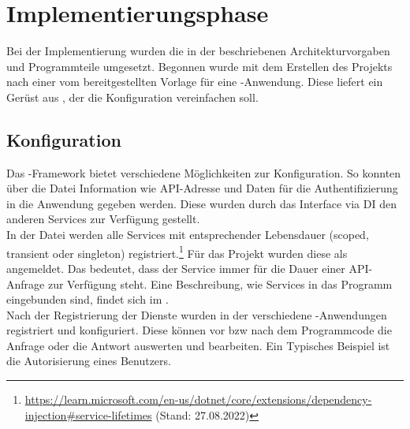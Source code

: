 \section{Implementierungsphase} 
\label{sec:Implementierungsphase}
Bei der Implementierung wurden die in der  beschriebenen Architekturvorgaben
und Programmteile umgesetzt. Begonnen wurde mit dem Erstellen des Projekts nach einer vom 
bereitgestellten Vorlage für eine -Anwendung. Diese liefert ein Gerüst aus
, der \zB die Konfiguration vereinfachen soll.

\subsection{Konfiguration}
\label{sec:Konfiguration}
Das -Framework bietet verschiedene Möglichkeiten zur Konfiguration.
So konnten über die Datei  Information wie \acs{API}-Adresse und Daten für die
Authentifizierung in die Anwendung gegeben werden. Diese wurden durch das Interface 
via \acs{DI} den anderen Services zur Verfügung gestellt. \\
In der Datei  werden alle Services mit entsprechender Lebensdauer (scoped, transient oder singleton)
registriert.\footnote{\url{https://learn.microsoft.com/en-us/dotnet/core/extensions/dependency-injection\#service-lifetimes} (Stand: 27.08.2022)}
Für das Projekt wurden diese als  angemeldet. Das bedeutet, dass der Service immer für die Dauer einer
\acs{API}-Anfrage zur Verfügung steht. Eine Beschreibung, wie Services in das Programm eingebunden sind, findet sich im 
.\\
Nach der Registrierung der Dienste wurden in der  verschiedene -Anwendungen 
registriert und konfiguriert. Diese können vor \acs{bzw} nach dem Programmcode die Anfrage oder die Antwort auswerten 
und bearbeiten. Ein Typisches Beispiel ist die Autorisierung eines Benutzers.


